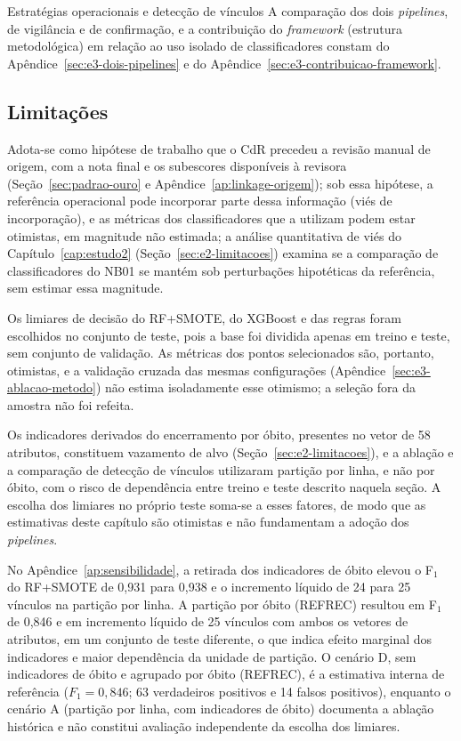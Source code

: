 \begin{chapter}{Estratégias operacionais e detecção de vínculos}
A comparação dos dois \textit{pipelines}, de vigilância e de confirmação, e a contribuição do \textit{framework} (estrutura metodológica) em relação ao uso isolado de classificadores constam do Apêndice~\ref{sec:e3-dois-pipelines} e do Apêndice~\ref{sec:e3-contribuicao-framework}.

\subsection{Limitações}\label{sec:e3-limitacoes}

Adota-se como hipótese de trabalho que o CdR precedeu a revisão manual de origem, com a nota final e os subescores disponíveis à revisora (Seção~\ref{sec:padrao-ouro} e Apêndice~\ref{ap:linkage-origem}); sob essa hipótese, a referência operacional pode incorporar parte dessa informação (viés de incorporação), e as métricas dos classificadores que a utilizam podem estar otimistas, em magnitude não estimada; a análise quantitativa de viés do Capítulo~\ref{cap:estudo2} (Seção~\ref{sec:e2-limitacoes}) examina se a comparação de classificadores do NB01 se mantém sob perturbações hipotéticas da referência, sem estimar essa magnitude.

Os limiares de decisão do RF+SMOTE, do XGBoost e das regras foram escolhidos no conjunto de teste, pois a base foi dividida apenas em treino e teste, sem conjunto de validação. As métricas dos pontos selecionados são, portanto, otimistas, e a validação cruzada das mesmas configurações (Apêndice~\ref{sec:e3-ablacao-metodo}) não estima isoladamente esse otimismo; a seleção fora da amostra não foi refeita.

Os indicadores derivados do encerramento por óbito, presentes no vetor de 58 atributos, constituem vazamento de alvo (Seção~\ref{sec:e2-limitacoes}), e a ablação e a comparação de detecção de vínculos utilizaram partição por linha, e não por óbito, com o risco de dependência entre treino e teste descrito naquela seção. A escolha dos limiares no próprio teste soma-se a esses fatores, de modo que as estimativas deste capítulo são otimistas e não fundamentam a adoção dos \textit{pipelines}.

No Apêndice~\ref{ap:sensibilidade}, a retirada dos indicadores de óbito elevou o F$_1$ do RF+SMOTE de 0,931 para 0,938 e o incremento líquido de 24 para 25 vínculos na partição por linha. A partição por óbito (REFREC) resultou em F$_1$ de 0,846 e em incremento líquido de 25 vínculos com ambos os vetores de atributos, em um conjunto de teste diferente, o que indica efeito marginal dos indicadores e maior dependência da unidade de partição. O cenário D, sem indicadores de óbito e agrupado por óbito (REFREC), é a estimativa interna de referência ($F_1=0{,}846$; 63 verdadeiros positivos e 14 falsos positivos), enquanto o cenário A (partição por linha, com indicadores de óbito) documenta a ablação histórica e não constitui avaliação independente da escolha dos limiares.

\end{chapter}

